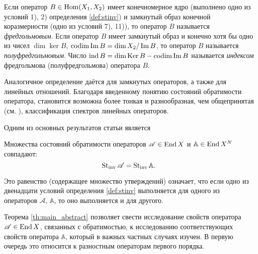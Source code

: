 \begin{definition}
Если оператор $B \in \operatorname{Hom}(X_1, X_2)$ имеет конечномерное ядро (выполнено одно из условий 1), 2) определения \ref{def:stinv}) и замкнутый образ конечной коразмерности (одно из условий 7), 11)), то оператор $B$ называется \emph{фредгольмовым}. Если оператор $B$ имеет замкнутый образ и конечно хотя бы одно из чисел $\dim \ker B$, $\operatorname{codim} \operatorname{Im} B = \dim X_2 / \operatorname{Im} B$, то оператор $B$ называется \emph{полуфредгольмовым}. Число $\operatorname{ind} B = \dim \operatorname{Ker} B - \operatorname{codim} \operatorname{Im} B$ называется \emph{индексом} фредгольмова (полуфредгольмова) оператора $B$.
\end{definition}

Аналогичное определение даётся для замкнутых операторов, а также для линейных отношений.
Благодаря введенному понятию состояний обратимости оператора, становится возможна более тонкая и разнообразная, чем общепринятая (см. \cite{dunford}), классификация спектров линейных операторов.

Одним из основных результатов статьи является
\begin{theorem}\label{th:main_abstract}
    Множества состояний обратимости операторов $ \mathcal A \in \operatorname{End}{X}$ и $\mathbb A \in \operatorname{End}{X^{N}}$ совпадают:
    \[ \operatorname{St_{inv}}{\mathcal A} = \operatorname{St_{inv}}{\mathbb A}. \]
\end{theorem}
Это равенство (содержащее множество утверждений) означает, что если одно из двенадцати условий определения \ref{def:stinv} выполняется для одного из операторов $ \mathcal A$, $\mathbb A$, то оно выполняется и для другого.

Теорема \ref{th:main_abstract} позволяет свести исследование свойств оператора $\mathcal A \in \operatorname{End}{X}$, связанных с обратимостью, к исследованию соответствующих свойств оператора $\mathbb A$, который в важных частных случаях изучен. В первую очередь это относится к разностным операторам первого порядка.

